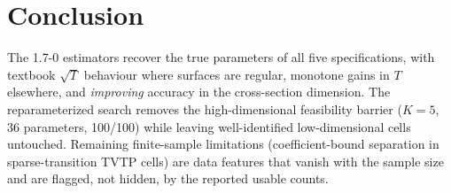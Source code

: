 \documentclass[11pt]{article}
\begin{document}
\section{Conclusion}
The 1.7-0 estimators recover the true parameters of all five
specifications, with textbook $\sqrt{T}$ behaviour where surfaces are
regular, monotone gains in $T$ elsewhere, and \emph{improving} accuracy in
the cross-section dimension. The reparameterized search removes the
high-dimensional feasibility barrier ($K = 5$, 36 parameters, 100/100)
while leaving well-identified low-dimensional cells untouched. Remaining
finite-sample limitations (coefficient-bound separation in sparse-transition
TVTP cells) are data features that vanish with the sample size and are
flagged, not hidden, by the reported usable counts.
\end{document}
